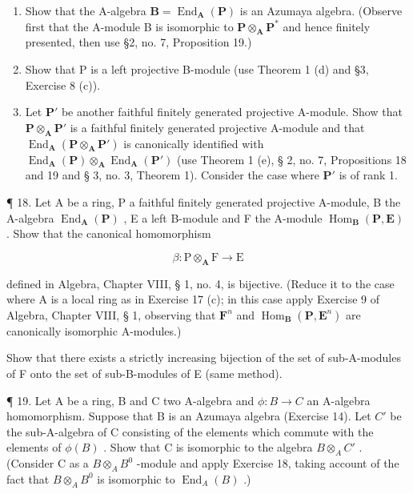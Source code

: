 \begin{enumerate}
\def\labelenumi{(\alph{enumi})}
\item
  Show that the A-algebra \(\mathbf{B} = \operatorname{End}_{\mathbf{A}}(\mathbf{P})\) is an Azumaya algebra. (Observe first that the A-module B is isomorphic to \(\mathbf{P} \otimes_{\mathbf{A}} \mathbf{P}^*\) and hence finitely presented, then use §2, no. 7, Proposition 19.)
\item
  Show that P is a left projective B-module (use Theorem 1 (d) and §3, Exercise 8 (c)).
\item
  Let \(\mathbf{P}'\) be another faithful finitely generated projective A-module. Show that \(\mathbf{P} \otimes_{\mathbf{A}} \mathbf{P}'\) is a faithful finitely generated projective A-module and that \(\operatorname{End}_{\mathbf{A}}(\mathbf{P} \otimes_{\mathbf{A}} \mathbf{P}')\) is canonically identified with \(\operatorname{End}_{\mathbf{A}}(\mathbf{P}) \otimes_{\mathbf{A}} \operatorname{End}_{\mathbf{A}}(\mathbf{P}')\) (use Theorem 1 (e), § 2, no. 7, Propositions 18 and 19 and § 3, no. 3, Theorem 1). Consider the case where \(\mathbf{P}'\) is of rank 1.
\end{enumerate}

¶ 18. Let A be a ring, P a faithful finitely generated projective A-module, B the A-algebra \(\operatorname{End}_{\mathbf{A}}(\mathbf{P})\) , E a left B-module and F the A-module \(\operatorname{Hom}_{\mathbf{B}}(\mathbf{P}, \mathbf{E})\) . Show that the canonical homomorphism

\[
\beta \colon \mathrm{P} \otimes_ {\mathbf {A}} \mathrm{F} \rightarrow \mathrm{E}
\]

defined in Algebra, Chapter VIII, § 1, no. 4, is bijective. (Reduce it to the case where A is a local ring as in Exercise 17 (c); in this case apply Exercise 9 of Algebra, Chapter VIII, § 1, observing that \(\mathbf{F}^n\) and \(\operatorname{Hom}_{\mathbf{B}}(\mathbf{P}, \mathbf{E}^n)\) are canonically isomorphic A-modules.)

Show that there exists a strictly increasing bijection of the set of sub-A-modules of F onto the set of sub-B-modules of E (same method).

¶ 19. Let A be a ring, B and C two A-algebra and \(\phi: B \to C\) an A-algebra homomorphism. Suppose that B is an Azumaya algebra (Exercise 14). Let \(C'\) be the sub-A-algebra of C consisting of the elements which commute with the elements of \(\phi(B)\) . Show that C is isomorphic to the algebra \(B \otimes_A C'\) . (Consider C as a \(B \otimes_A B^0\) -module and apply Exercise 18, taking account of the fact that \(B \otimes_A B^0\) is isomorphic to \(\operatorname{End}_A(B)\) .)

